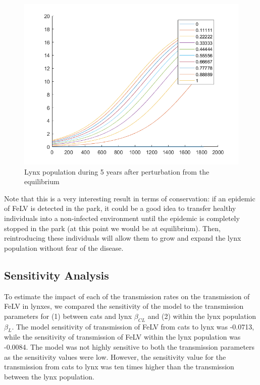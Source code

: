 \documentclass[12pt]{article}
\begin{document}
\begin{figure}[!ht]
    \centering
    \includegraphics[scale=0.75]{images/stability.png}
    \caption{Lynx population during 5 years after perturbation from the equilibrium}
    \label{fig:my_label}
\end{figure}

\quad Note that this is a very interesting result in terms of conservation: if an epidemic of FeLV is detected in the park, it could be a good idea to transfer healthy individuals into a non-infected environment until the epidemic is completely stopped in the park (at this point we would be at equilibrium). Then, reintroducing these individuals will allow them to grow and expand the lynx population without fear of the disease.

\subsection{Sensitivity Analysis}
\quad To estimate the impact of each of the transmission rates on the transmission of FeLV in lynxes, we compared the sensitivity of the model to the transmission parameters for  (1) between cats and lynx $\beta_{CL}$ and (2) within the lynx population $\beta_L$. The model sensitivity of transmission of FeLV from cats to lynx was -0.0713, while the sensitivity of transmission of FeLV within the lynx population was -0.0084. The model was not highly sensitive to both the transmission parameters as the sensitivity values were low. However, the sensitivity value for the transmission from cats to lynx was ten times higher than the transmission between the lynx population. 
\end{document}
